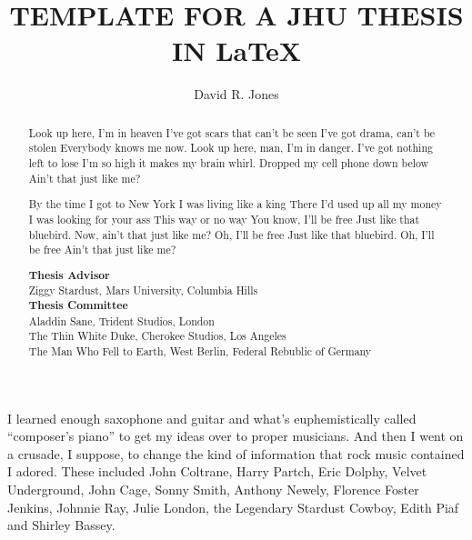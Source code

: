 
\title{TEMPLATE FOR A JHU THESIS IN LaTeX}
\author{David R. Jones}
\dissertation
\doctorphilosophy
\copyrightnotice

\begin{frontmatter}

\maketitle


\begin{abstract}


Look up here, I'm in heaven
I've got scars that can't be seen
I've got drama, can't be stolen
Everybody knows me now.
Look up here, man, I'm in danger.
I've got nothing left to lose
I'm so high it makes my brain whirl.
Dropped my cell phone down below
Ain't that just like me?

By the time I got to New York
I was living like a king
There I'd used up all my money
I was looking for your ass
This way or no way
You know, I'll be free
Just like that bluebird.
Now, ain't that just like me?
Oh, I'll be free
Just like that bluebird.
Oh, I'll be free
Ain't that just like me?

\vspace{1cm}


\noindent \textbf{Thesis Advisor}\\
Ziggy Stardust, Mars University, Columbia Hills\\
\textbf{Thesis Committee}\\
Aladdin Sane, Trident Studios, London\\
The Thin White Duke, Cherokee Studios, Los Angeles\\
The Man Who Fell to Earth, West Berlin, Federal Rebublic of Germany\\


\end{abstract}

\begin{acknowledgment}


I learned enough saxophone and guitar and what's euphemistically called \enquote{composer's piano} to get my ideas over to proper musicians. And then I went on a crusade, I suppose, to change the kind of information that rock music contained I adored. These included John Coltrane, Harry Partch, Eric Dolphy, Velvet Underground, John Cage, Sonny Smith, Anthony Newely, Florence Foster Jenkins, Johnnie Ray, Julie London, the Legendary Stardust Cowboy, Edith Piaf and Shirley Bassey.


\end{acknowledgment}
\end{frontmatter}
